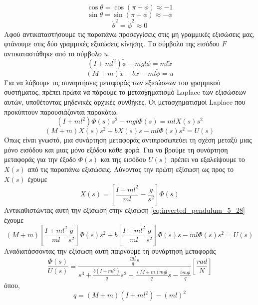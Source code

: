 \begin{equation}
\cos\theta=\cos(\pi+\phi)\approx -1
\end{equation}
\begin{equation}
\sin\theta=\sin(\pi+\phi)\approx -\phi
\end{equation}
\begin{equation}
\dot{\theta}^2=\dot{\phi}^2\approx 0
\end{equation}
Αφού αντικαταστήσουμε τις παραπάνω προσεγγίσεις στις μη γραμμικές εξισώσεις μας, φτάνουμε στις δύο γραμμικές εξισώσεις κίνησης. Το σύμβολο της εισόδου $F$ αντικαταστάθηκε από το σύμβολο $u$.
\begin{equation}
\left(I+ml^2\right)\ddot{\phi}-mgl\phi=ml\ddot{x}
\end{equation}
\begin{equation}
\left(M+m\right)\ddot{x}+b\dot{x}-ml\ddot{\phi}=u
\end{equation}
Για να λάβουμε τις συναρτήσεις μεταφοράς των εξισώσεων του γραμμικού συστήματος, πρέπει πρώτα να πάρουμε το μετασχηματισμό Laplace των εξισώσεων αυτών, υποθέτοντας μηδενικές αρχικές συνθήκες. Οι μετασχηματισμοί Laplace που προκύπτουν παρουσιάζονται παρακάτω.
\begin{equation}
\left(I+ml^2\right)\Phi(s)s^2-mgl\Phi(s)=mlX(s)s^2
\end{equation}
\begin{equation}
\left(M+m\right)X(s)s^2+bX(s)s-ml\Phi(s)s^2=U(s)
\label{eq:inverted_pendulum_5_28}
\end{equation}
Όπως είναι γνωστό, μια συνάρτηση μεταφοράς αντιπροσωπεύει τη σχέση μεταξύ μιας μόνο εισόδου και μιας μόνο εξόδου κάθε φορά. Για να βρούμε τη συνάρτηση μεταφοράς για την έξοδο $\Phi(s)$ και της εισόδου $U(s)$ πρέπει να εξαλείψουμε το $X(s)$ από τις παραπάνω εξισώσεις. Λύνοντας την πρώτη εξίσωση ως προς το $X(s)$ έχουμε
\begin{equation}
X(s) = \left[\frac{I+ml^2}{ml}-\frac{g}{s^2}\right]\Phi(s)
\end{equation}
Αντικαθιστώντας αυτή την εξίσωση στην εξίσωση \ref{eq:inverted_pendulum_5_28} έχουμε
\begin{equation}
\left(M+m\right)\left[\frac{I+ml^2}{ml}\frac{g}{s^2}\right]\Phi(s)s^2+b\left[\frac{I+ml^2}{ml}\frac{g}{s^2}\right]\Phi(s)s-ml\Phi(s)s^2=U(s)
\end{equation}
Αναδιατάσσοντας την εξίσωση αυτή παίρνουμε τη συνάρτηση μεταφοράς
\begin{equation}
\frac{\Phi(s)}{U(s)} = \frac{\frac{ml}{q}s}{s^3+\frac{b(I+ml^2)}{q}s^2-\frac{(M+m)mgl}{q}s-\frac{bmgl}{q}} \left[\frac{rad}{N}\right]
\end{equation}
όπου,
\begin{equation}
q = \left(M+m\right)\left(I+ml^2\right)-\left(ml\right)^2
\end{equation}

